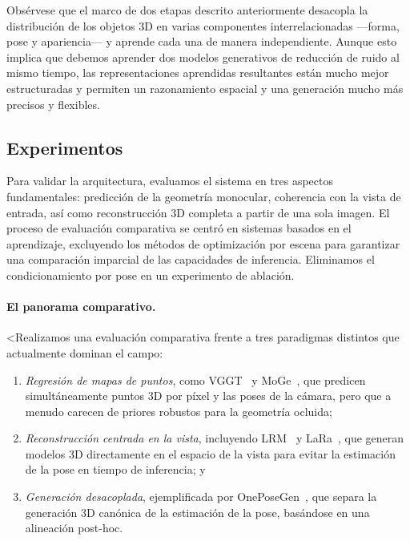 \documentclass[../../book-main_es.tex]{subfiles}
\begin{document}
\begin{remark}
Obsérvese que el marco de dos etapas descrito anteriormente desacopla la distribución
de los objetos 3D en varias componentes interrelacionadas ---forma, pose y
apariencia--- y aprende cada una de manera independiente. Aunque esto implica que debemos
aprender dos modelos generativos de reducción de ruido al mismo tiempo, las representaciones aprendidas
resultantes están mucho mejor estructuradas y permiten un razonamiento espacial y una generación mucho más
precisos y flexibles.
\end{remark}

\subsection{Experimentos}
\label{sec:experiments}
\label{sec:Evaluation}

Para validar la arquitectura, evaluamos el sistema en tres aspectos fundamentales: predicción 
de la geometría monocular, coherencia con la vista de entrada, así como 
reconstrucción 3D completa a partir de una sola imagen. El proceso de evaluación comparativa se centró en 
sistemas basados en el aprendizaje, excluyendo los métodos de optimización por escena para garantizar 
una comparación imparcial de las capacidades de inferencia. Eliminamos el condicionamiento por pose en un experimento de ablación.

\paragraph{El panorama comparativo.}
<Realizamos una evaluación comparativa frente a tres paradigmas distintos que actualmente dominan el campo:
\begin{enumerate}[label=(\roman*)]
    \item \textit{Regresión de mapas de puntos}, como VGGT~\citep{wang2025vggt} y MoGe~\citep{wang2025moge}, 
          que predicen simultáneamente puntos 3D por píxel y las poses de la cámara, pero que a menudo carecen 
          de priores robustos para la geometría ocluida;
    \item \textit{Reconstrucción centrada en la vista}, incluyendo LRM~\citep{hong2023lrm} y LaRa~\citep{LaRa}, 
          que generan modelos 3D directamente en el espacio de la vista para evitar la estimación de la pose 
          en tiempo de inferencia; y
    \item \textit{Generación desacoplada}, ejemplificada por OnePoseGen~\citep{geng2025one}, que separa la 
          generación 3D canónica de la estimación de la pose, basándose en una alineación post-hoc.
\end{enumerate}
\end{document}
